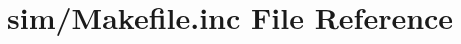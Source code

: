 \hypertarget{sim_2_makefile_8inc}{\section{sim/\+Makefile.inc File Reference}
\label{sim_2_makefile_8inc}
}
